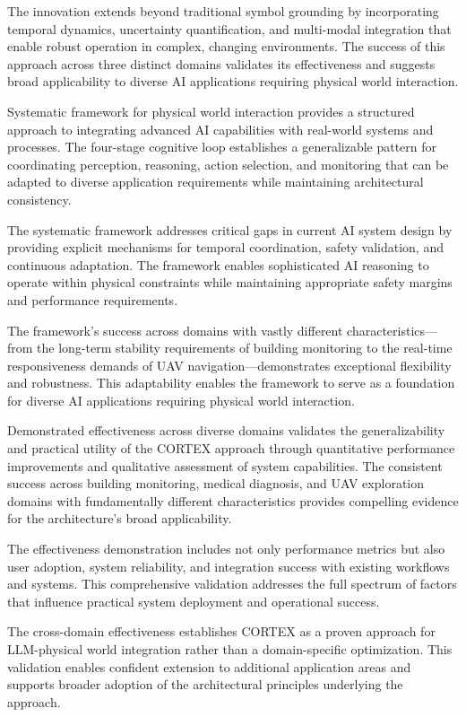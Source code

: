The innovation extends beyond traditional symbol grounding by incorporating temporal dynamics, uncertainty quantification, and multi-modal integration that enable robust operation in complex, changing environments. The success of this approach across three distinct domains validates its effectiveness and suggests broad applicability to diverse AI applications requiring physical world interaction.

Systematic framework for physical world interaction provides a structured approach to integrating advanced AI capabilities with real-world systems and processes. The four-stage cognitive loop establishes a generalizable pattern for coordinating perception, reasoning, action selection, and monitoring that can be adapted to diverse application requirements while maintaining architectural consistency.

The systematic framework addresses critical gaps in current AI system design by providing explicit mechanisms for temporal coordination, safety validation, and continuous adaptation. The framework enables sophisticated AI reasoning to operate within physical constraints while maintaining appropriate safety margins and performance requirements.

The framework's success across domains with vastly different characteristics—from the long-term stability requirements of building monitoring to the real-time responsiveness demands of UAV navigation—demonstrates exceptional flexibility and robustness. This adaptability enables the framework to serve as a foundation for diverse AI applications requiring physical world interaction.

Demonstrated effectiveness across diverse domains validates the generalizability and practical utility of the CORTEX approach through quantitative performance improvements and qualitative assessment of system capabilities. The consistent success across building monitoring, medical diagnosis, and UAV exploration domains with fundamentally different characteristics provides compelling evidence for the architecture's broad applicability.

The effectiveness demonstration includes not only performance metrics but also user adoption, system reliability, and integration success with existing workflows and systems. This comprehensive validation addresses the full spectrum of factors that influence practical system deployment and operational success.

The cross-domain effectiveness establishes CORTEX as a proven approach for LLM-physical world integration rather than a domain-specific optimization. This validation enables confident extension to additional application areas and supports broader adoption of the architectural principles underlying the approach.

